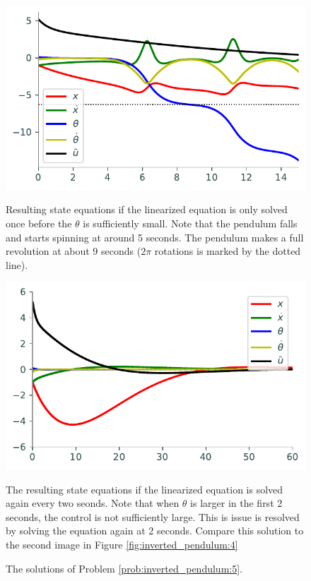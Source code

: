 \begin{figure}[H]
\begin{minipage}[b]{.47\linewidth}
\centering
\includegraphics[width=\textwidth]{figures/nonlinear_attempt1.pdf}
\caption*{Resulting state equations if the linearized equation is only solved once before the $\theta$ is sufficiently small. Note that the pendulum falls and starts spinning at around 5 seconds. The pendulum makes a full revolution at about 9 seconds ($2\pi$ rotations is marked by the dotted line).}
\end{minipage}
\hspace{0.5cm}
\begin{minipage}[b]{0.47\linewidth}
\centering
\includegraphics[width=\textwidth]{figures/nonlinear_attempt2.pdf}
\caption*{The resulting state equations if the linearized equation is solved again every two seonds. Note that when $\theta$ is larger in the first 2 seconds, the control is not sufficiently large. This is issue is resolved by solving the equation again at 2 seconds. Compare this solution to the second image in Figure \ref{fig:inverted_pendulum:4}}
\end{minipage}
\caption{The solutions of Problem \ref{prob:inverted_pendulum:5}.}
\label{fig:nonlinear_inverted_pendulum:5}
\end{figure}

